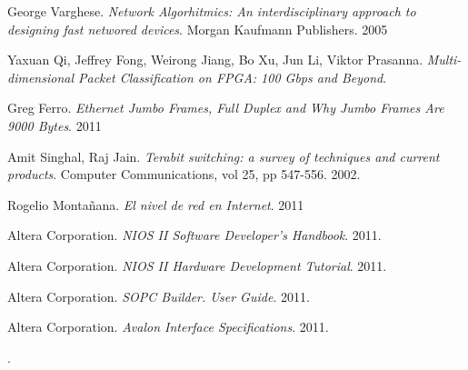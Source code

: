 \begin{thebibliography}{10}
 George Varghese. \textit{Network Algorhitmics: An interdisciplinary approach to designing fast networed devices}. Morgan Kaufmann Publishers. 2005 

Yaxuan Qi, Jeffrey Fong, Weirong Jiang, Bo Xu, Jun Li, Viktor Prasanna. \textit{Multi-dimensional Packet Classification on FPGA: 100 Gbps and Beyond}.

 Greg Ferro. \textit{Ethernet Jumbo Frames, Full Duplex and Why Jumbo Frames Are 9000 Bytes}. 2011

Amit Singhal, Raj Jain. \textit{Terabit switching: a survey of techniques and current products}. Computer Communications, vol 25, pp 547-556. 2002.


 Rogelio Montañana. \textit{El nivel de red en Internet}. 2011

 Altera Corporation. \textit{NIOS II Software Developer's Handbook}. 2011.

 Altera Corporation. \textit{NIOS II Hardware Development Tutorial}. 2011.

 Altera Corporation. \textit{SOPC Builder. User Guide}. 2011.

 Altera Corporation. \textit{Avalon Interface Specifications}. 2011.


\end{thebibliography}.
